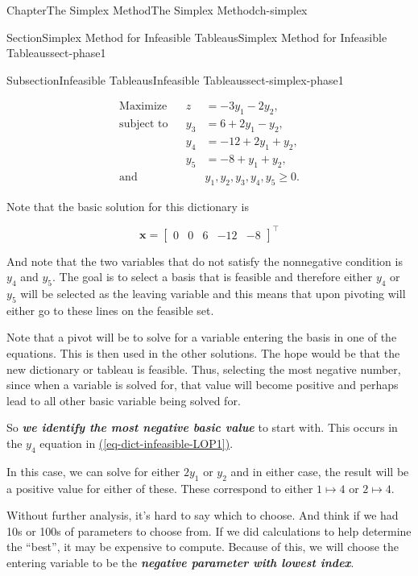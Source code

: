 \documentclass[oneside,10pt,]{book}
\newcommand{\xreffont}{\relax}
\newcommand{\alert}[1]{\textbf{\textit{#1}}}
\numberwithin{equation}{section}
\newcommand{\amp}{&}
\begin{document}
\begin{chapterptx}{Chapter}{The Simplex Method}{}{The Simplex Method}{}{}{ch-simplex}
\begin{sectionptx}{Section}{Simplex Method for Infeasible Tableaus}{}{Simplex Method for Infeasible Tableaus}{}{}{sect-phase1}
\begin{subsectionptx}{Subsection}{Infeasible Tableaus}{}{Infeasible Tableaus}{}{}{sect-simplex-phase1}
\par
%
\begin{equation}
\begin{aligned} \text{Maximize} \amp\amp z \amp = -3y_1 -2 y_2,  \\ \text{subject to}\amp \amp y_3 \amp = 6 + 2y_1 - y_2, \\ \amp \amp y_4 \amp = -12 + 2y_1 + y_2, \\ \amp \amp y_5 \amp = -8 + y_1 + y_2, \\ \text{and} \amp \amp \amp y_1, y_2, y_3, y_4, y_5 \geq 0.
\end{aligned}\label{eq-dict-infeasible-LOP1}
\end{equation}
%
\par
Note that the basic solution for this dictionary is%
\par
%
\begin{equation*}
\boldsymbol{x} = \left[\begin{array}{rr|rrr} 0 \amp 0 \amp 6 \amp -12 \amp -8 \end{array}\right]^{\intercal}
\end{equation*}
%
\par
And note that the two variables that do not satisfy the nonnegative condition is \(y_4\) and \(y_5\). The goal is to select a basis that is feasible and therefore either \(y_4\) or \(y_5\) will be selected as the leaving variable and this means that upon pivoting will either go to these lines on the feasible set.%
\par
Note that a pivot will be to solve for a variable entering the basis in one of the equations. This is then used in the other solutions. The hope would be that the new dictionary or tableau is feasible. Thus, selecting the most negative number, since when a variable is solved for, that value will become positive and perhaps lead to all other basic variable being solved for.%
\par
So \alert{we identify the most negative basic value} to start with. This occurs in the \(y_4\) equation in \hyperref[eq-dict-infeasible-LOP1]{({\xreffont\ref{eq-dict-infeasible-LOP1}})}.%
\par
In this case, we can solve for either \(2y_1\) or \(y_2\) and in either case, the result will be a positive value for either of these. These correspond to either \(1 \mapsto 4\) or \(2 \mapsto 4\).%
\par
Without further analysis, it's hard to say which to choose. And think if we had 10s or 100s of parameters to choose from.  If we did calculations to help determine the ``best'', it may be expensive to compute.  Because of this, we will choose the entering variable to be the \alert{negative parameter with lowest index}.%

\end{subsectionptx}
\end{sectionptx}
\end{chapterptx}
\end{document}
